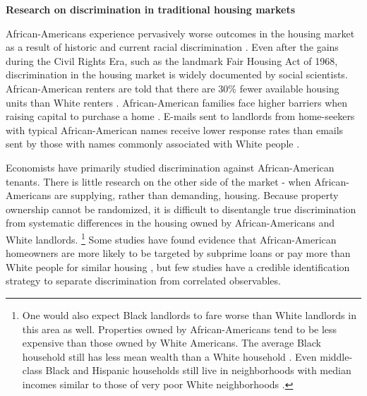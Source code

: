 
\vspace{5mm}
\textbf{Research on discrimination in traditional housing markets}

African-Americans experience pervasively worse outcomes in the housing market as a result of historic and current racial discrimination \citep{krysan}. Even after the gains during the Civil Rights Era, such as the landmark Fair Housing Act of 1968, discrimination in the housing market is widely documented by social scientists. African-American renters are told that there are 30\% fewer available housing units than White renters \citep{yinger1}. African-American families face higher barriers when raising capital to purchase a home \citep{pope}. E-mails sent to landlords from home-seekers with typical African-American names receive lower response rates than emails sent by those with names commonly associated with White people \citep{hanson}.

Economists have primarily studied discrimination against African-American tenants. There is little research on the other side of the market - when African-Americans are supplying, rather than demanding, housing. Because property ownership cannot be randomized, it is difficult to disentangle true discrimination from systematic differences in the housing owned by African-Americans and White landlords.%
	\footnote{One would also expect Black landlords to fare worse than White landlords in this area as well. Properties owned by African-Americans tend to be less expensive than those owned by White Americans. The average Black household still has less mean wealth than a White household \citep{oliver}. Even middle-class Black and Hispanic households still live in neighborhoods with median incomes similar to those of very poor White neighborhoods \citep{reardon}.} 
Some studies have found evidence that African-American homeowners are more likely to be targeted by subprime loans \citep{foreclosure} or pay more than White people for similar housing \citep{bayer, myers}, but few studies have a credible identification strategy to separate discrimination from correlated observables. 

